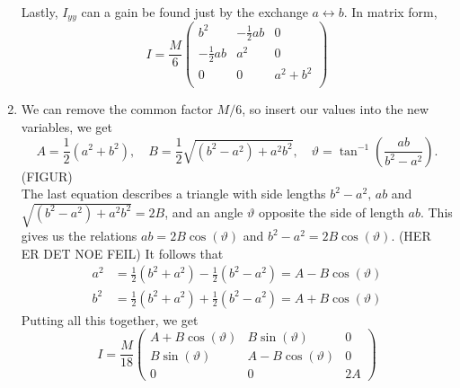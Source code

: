 \documentclass{article}
\begin{document}
\begin{enumerate}[label=(\alph*)]
\begin{align*}
        \end{align*} 
        Lastly, $I_{yy}$ can a gain be found just by the exchange $a \leftrightarrow b$. In matrix form,
        \begin{equation*}
            I = \frac{M}{6}
            \begin{pmatrix*}
                b^2 & -\frac{1}{2} ab & 0 \\
                -\frac{1}{2} ab & a^2 & 0 \\
                0 & 0 & a^2 + b^2 \\
            \end{pmatrix*}
        \end{equation*}
        \item We can remove the common factor $M/6$, so insert our values into the new variables, we get
        \begin{equation*}
            A = \frac{1}{2}(a^2 + b^2), \quad B = \frac{1}{2}\sqrt{(b^2 - a^2) +a^2b^2}, \quad \vartheta = \tan^{-1}\left( \frac{ab}{b^2 - a^2} \right).
        \end{equation*}
        (FIGUR)\\
        The last equation describes a triangle with side lengths $b^2 - a^2, \, ab$ and $\sqrt{(b^2 - a^2) +a^2b^2} = 2B$, and an angle $\vartheta$ opposite the side of length $ab$. This gives us the relations $ab=2 B \cos(\vartheta)$ and $b^2 - a^2 = 2B \cos(\vartheta)$. (HER ER DET NOE FEIL) It follows that
        \begin{align*}
            a^2 &= \frac{1}{2}(b^2 + a^2)  - \frac{1}{2}(b^2 - a^2) = A - B \cos(\vartheta) \\
        b^2 &= \frac{1}{2}(b^2 + a^2)  + \frac{1}{2}(b^2 - a^2) = A + B \cos(\vartheta)
        \end{align*}
        Putting all this together, we get 
        \begin{equation*}
            I = \frac{M}{18}
            \begin{pmatrix*}
                A + B\cos(\vartheta) & B \sin(\vartheta) & 0 \\
                B \sin(\vartheta) & A - B\cos(\vartheta) & 0 \\
                0 & 0 & 2A
            \end{pmatrix*}
        \end{equation*}


\end{enumerate}
\end{document}
